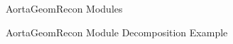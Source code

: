 \begin{figure}[H]
    \centering
    \caption[AortaGeomRecon Modules]{AortaGeomRecon Modules}
    \label{fig_agr_modules}
\end{figure}

\begin{figure}[H]
    \centering
    \caption[AortaGeomRecon Module Decomposition Example]{AortaGeomRecon Module Decomposition Example}
    \label{fig_agr_md}
\end{figure}

